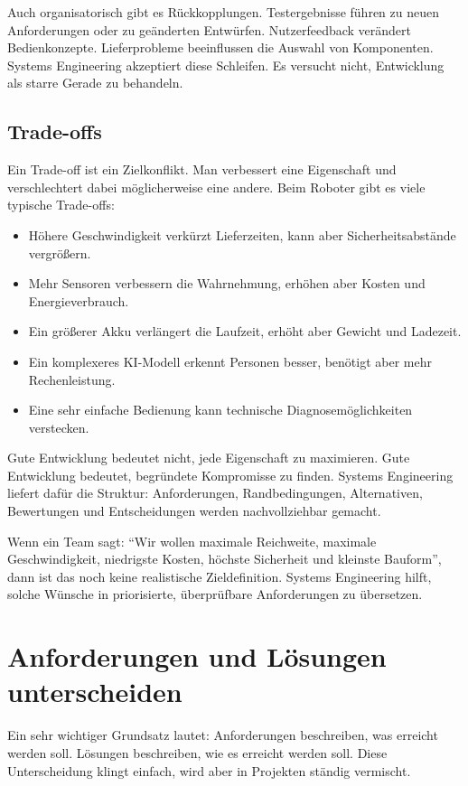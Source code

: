 Auch organisatorisch gibt es Rückkopplungen. Testergebnisse führen zu neuen Anforderungen oder zu geänderten Entwürfen. Nutzerfeedback verändert Bedienkonzepte. Lieferprobleme beeinflussen die Auswahl von Komponenten. Systems Engineering akzeptiert diese Schleifen. Es versucht nicht, Entwicklung als starre Gerade zu behandeln.

\subsection{Trade-offs}
Ein Trade-off ist ein Zielkonflikt. Man verbessert eine Eigenschaft und verschlechtert dabei möglicherweise eine andere. Beim Roboter gibt es viele typische Trade-offs:

\begin{itemize}
    \item Höhere Geschwindigkeit verkürzt Lieferzeiten, kann aber Sicherheitsabstände vergrößern.
    \item Mehr Sensoren verbessern die Wahrnehmung, erhöhen aber Kosten und Energieverbrauch.
    \item Ein größerer Akku verlängert die Laufzeit, erhöht aber Gewicht und Ladezeit.
    \item Ein komplexeres KI-Modell erkennt Personen besser, benötigt aber mehr Rechenleistung.
    \item Eine sehr einfache Bedienung kann technische Diagnosemöglichkeiten verstecken.
\end{itemize}

Gute Entwicklung bedeutet nicht, jede Eigenschaft zu maximieren. Gute Entwicklung bedeutet, begründete Kompromisse zu finden. Systems Engineering liefert dafür die Struktur: Anforderungen, Randbedingungen, Alternativen, Bewertungen und Entscheidungen werden nachvollziehbar gemacht.

\begin{hinweisbox}
Wenn ein Team sagt: \enquote{Wir wollen maximale Reichweite, maximale Geschwindigkeit, niedrigste Kosten, höchste Sicherheit und kleinste Bauform}, dann ist das noch keine realistische Zieldefinition. Systems Engineering hilft, solche Wünsche in priorisierte, überprüfbare Anforderungen zu übersetzen.
\end{hinweisbox}

\section{Anforderungen und Lösungen unterscheiden}
Ein sehr wichtiger Grundsatz lautet: Anforderungen beschreiben, was erreicht werden soll. Lösungen beschreiben, wie es erreicht werden soll. Diese Unterscheidung klingt einfach, wird aber in Projekten ständig vermischt.

